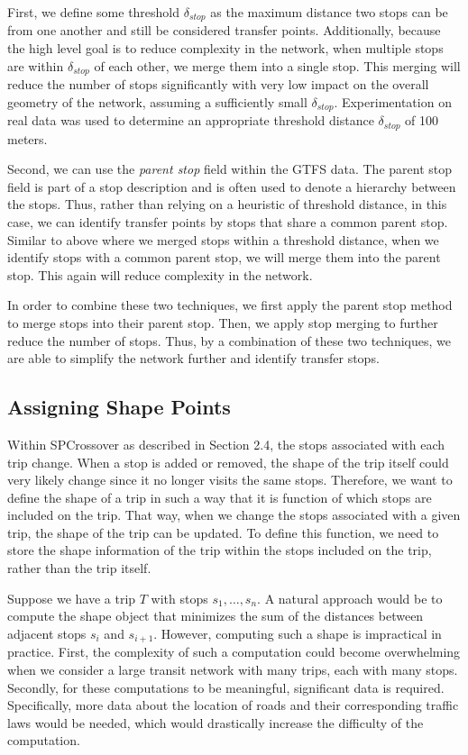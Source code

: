 \documentclass[11pt]{amsart}
\theoremstyle{definition}                  %
\theoremstyle{remark}                       %
\numberwithin{equation}{section}
\begin{document}
First, we define some threshold $\delta_{stop}$ as the maximum distance two stops can be from one another and still be considered transfer points. Additionally, because the high level goal is to reduce complexity in the network, when multiple stops are within $\delta_{stop}$ of each other, we merge them into a single stop. This merging will reduce the number of stops significantly with very low impact on the overall geometry of the network, assuming a sufficiently small $\delta_{stop}$. Experimentation on real data was used to determine an appropriate threshold distance $\delta_{stop}$ of 100 meters.

Second, we can use the \textit{parent stop} field within the GTFS data. The parent stop field is part of a stop description and is often used to denote a hierarchy between the stops. Thus, rather than relying on a heuristic of threshold distance, in this case, we can identify transfer points by stops that share a common parent stop. Similar to above where we merged stops within a threshold distance, when we identify stops with a common parent stop, we will merge them into the parent stop. This again will reduce complexity in the network. 

In order to combine these two techniques, we first apply the parent stop method to merge stops into their parent stop. Then, we apply stop merging to further reduce the number of stops. Thus, by a combination of these two techniques, we are able to simplify the network further and identify transfer stops. 

\subsection{Assigning Shape Points}
Within SPCrossover as described in Section 2.4, the stops associated with each trip change. When a stop is added or removed, the shape of the trip itself could very likely change since it no longer visits the same stops. Therefore, we want to define the shape of a trip in such a way that it is function of which stops are included on the trip. That way, when we change the stops associated with a given trip, the shape of the trip can be updated. To define this function, we need to store the shape information of the trip within the stops included on the trip, rather than the trip itself. 

Suppose we have a trip $T$ with stops $s_1, \ldots, s_n$. A natural approach would be to compute the shape object that minimizes the sum of the distances between adjacent stops $s_i$ and $s_{i+1}$. However, computing such a shape is impractical in practice. First, the complexity of such a computation could become overwhelming when we consider a large transit network with many trips, each with many stops. Secondly, for these computations to be meaningful, significant data is required. Specifically, more data about the location of roads and their corresponding traffic laws would be needed, which would drastically increase the difficulty of the computation. 
\end{document}
